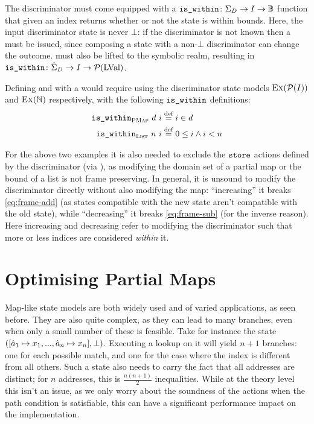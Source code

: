 The discriminator must come equipped with a $\texttt{is\_within}\colon \Sigma_D \rightarrow I \rightarrow \mathbb{B}$ function that given an index returns whether or not the state is within bounds. Here, the input discriminator state is never $\bot$: if the discriminator is not known then a \Miss{} must be issued, since composing a state with a non-$\bot$ discriminator can change the outcome.  must also be lifted to the symbolic realm, resulting in $\texttt{is\_within}\colon \hat{\Sigma}_D\rightarrow I\rightarrow {\cal P}(\text{LVal})$. 

Defining \PMap{} and \List{} with a \GMap{} would require using the discriminator state models $\textsc{Ex}({\cal P}(I))$ and $\textsc{Ex}(\mathbb N)$ respectively, with the following $\texttt{is\_within}$ definitions: \begin{align*}
	\texttt{is\_within}_{\textsc{PMap}}~d~i&\stackrel{\textnormal{def}}= i\in d\\
	\texttt{is\_within}_{\textsc{List}}~n~i&\stackrel{\textnormal{def}}= 0 \leq i \land i < n
\end{align*}

For the above two examples it is also needed to exclude the $\texttt{store}$ actions defined by the discriminator (via \Ex), as modifying the domain set of a partial map or the bound of a list is not frame preserving. In general, it is unsound to modify the discriminator directly without also modifying the map: ``increasing'' it breaks \ref{eq:frame-add} (as states compatible with the new state aren't compatible with the old state), while ``decreasing'' it breaks \ref{eq:frame-sub} (for the inverse reason). Here increasing and decreasing refer to modifying the discriminator such that more or less indices are considered \emph{within} it.

\section{Optimising Partial Maps} \label{sec:theory-optim-pmap}

Map-like state models are both widely used and of varied applications, as seen before. They are also quite complex, as they can lead to many branches, even when only a small number of these is feasible. Take for instance the \PMap{} state $([ \hat{a}_1\mapsto x_1, ..., \hat{a}_n\mapsto x_n ], \bot)$. Executing a lookup on it will yield $n+1$ branches: one for each possible match, and one for the case where the index is different from all others. Such a state also needs to carry the fact that all addresses are distinct; for $n$ addresses, this is $\frac{n(n+1)}{2}$ inequalities. While at the theory level this isn't an issue, as we only worry about the soundness of the actions when the path condition is satisfiable, this can have a significant performance impact on the implementation.

